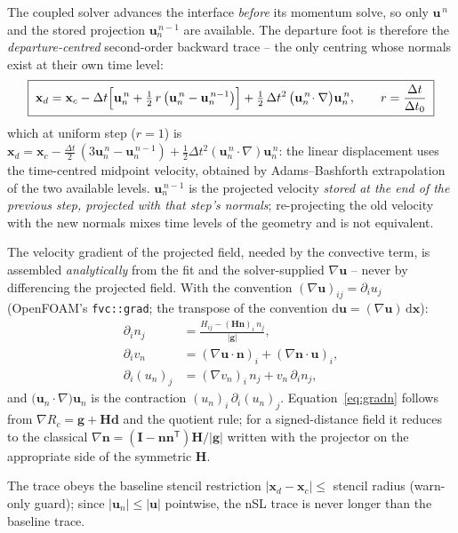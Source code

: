\documentclass[preprint,3p,11pt]{elsarticle}
\newcommand{\xc}{\mathbf{x}_c}
\newcommand{\xd}{\mathbf{x}_d}
\newcommand{\uvec}{\mathbf{u}}
\newcommand{\un}{\mathbf{u}_n}
\newcommand{\nv}{\mathbf{n}}
\newcommand{\gv}{\mathbf{g}}
\newcommand{\Hm}{\mathbf{H}}
\begin{document}
The coupled solver advances the interface \emph{before} its momentum solve, so
only $\uvec^{\,n}$ and the stored projection $\un^{\,n-1}$ are available. The
departure foot is therefore the \emph{departure-centred} second-order backward
trace -- the only centring whose normals exist at their own time level:
\begin{equation}
  \boxed{\;
  \xd=\xc
  -\Delta t\Bigl[\un^{\,n}
      +\tfrac12\,r\,\bigl(\un^{\,n}-\un^{\,n-1}\bigr)\Bigr]
  +\tfrac12\,\Delta t^{2}\,\bigl(\un^{\,n}\!\cdot\nabla\bigr)\un^{\,n},
  \qquad r=\frac{\Delta t}{\Delta t_0} \; }
  \label{eq:foot}
\end{equation}
which at uniform step ($r=1$) is
$\xd=\xc-\tfrac{\Delta t}{2}\,(3\un^{\,n}-\un^{\,n-1})
+\tfrac12\Delta t^2(\un^{\,n}\cdot\nabla)\un^{\,n}$: the linear displacement
uses the time-centred midpoint velocity, obtained by Adams--Bashforth
extrapolation of the two available levels. $\un^{\,n-1}$ is the projected
velocity \emph{stored at the end of the previous step, projected with that
step's normals}; re-projecting the old velocity with the new normals mixes
time levels of the geometry and is not equivalent.

The velocity gradient of the projected field, needed by the convective term,
is assembled \emph{analytically} from the fit and the solver-supplied
$\nabla\uvec$ -- never by differencing the projected field. With the
convention $(\nabla\uvec)_{ij}=\partial_i u_j$ (OpenFOAM's
\texttt{fvc::grad}; the transpose of the convention
$\mathrm d\uvec=(\nabla\uvec)\,\mathrm d\mathbf x$):
\begin{align}
  \partial_i n_j &= \frac{H_{ij}-(\Hm\nv)_i\,n_j}{\lvert\gv\rvert},
  \label{eq:gradn}\\
  \partial_i v_n &= (\nabla\uvec\cdot\nv)_i+(\nabla\nv\cdot\uvec)_i,\\
  \partial_i (u_n)_j &= (\nabla v_n)_i\,n_j + v_n\,\partial_i n_j,
\end{align}
and $\bigl(\un\cdot\nabla\bigr)\un$ is the contraction
$(u_n)_i\,\partial_i(u_n)_j$. Equation~\eqref{eq:gradn} follows from
$\nabla R_c=\gv+\Hm\mathbf d$ and the quotient rule; for a signed-distance
field it reduces to the classical $\nabla\nv=(\mathbf I-\nv\nv^{\mathsf T})
\Hm/\lvert\gv\rvert$ written with the projector on the appropriate side of the
symmetric $\Hm$.

The trace obeys the baseline stencil restriction
$\lvert\xd-\xc\rvert\le$ stencil radius (warn-only guard); since
$\lvert\un\rvert\le\lvert\uvec\rvert$ pointwise, the nSL trace is never longer
than the baseline trace.
\end{document}
